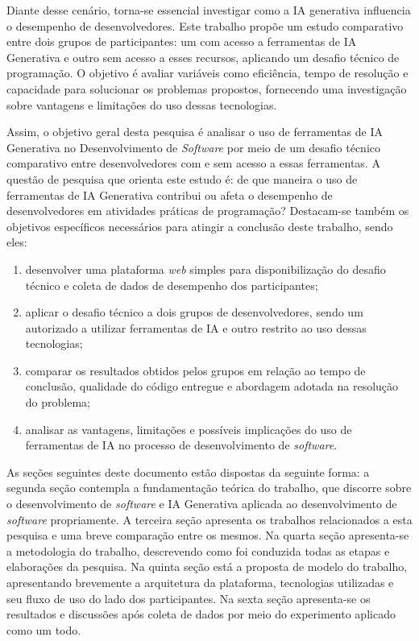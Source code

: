 \documentclass[english,brazilian]{UNISINOSartigo} %
\begin{document}
Diante desse cenário, torna-se essencial investigar como a IA generativa influencia o desempenho de desenvolvedores. Este trabalho propõe um estudo comparativo entre dois grupos de participantes: um com acesso a ferramentas de IA Generativa e outro sem acesso a esses recursos, aplicando um desafio técnico de programação. O objetivo é avaliar variáveis como eficiência, tempo de resolução e capacidade para solucionar os problemas propostos, fornecendo uma investigação sobre vantagens e limitações do uso dessas tecnologias.

Assim, o objetivo geral desta pesquisa é analisar o uso de ferramentas de IA Generativa no Desenvolvimento de \textit{Software} por meio de um desafio técnico comparativo entre desenvolvedores com e sem acesso a essas ferramentas. A questão de pesquisa que orienta este estudo é: de que maneira o uso de ferramentas de IA Generativa contribui ou afeta o desempenho de desenvolvedores em atividades práticas de programação? Destacam-se também os objetivos específicos necessários para atingir a conclusão deste trabalho, sendo eles:

\begin{enumerate}[label=\alph*), leftmargin=1.2cm, itemsep=0.1em, topsep=0.1em]
    \item desenvolver uma plataforma \textit{web} simples para disponibilização do desafio técnico e coleta de dados de desempenho dos participantes;
    \item aplicar o desafio técnico a dois grupos de desenvolvedores, sendo um autorizado a utilizar ferramentas de IA e outro restrito ao uso dessas tecnologias;
    \item comparar os resultados obtidos pelos grupos em relação ao tempo de conclusão, qualidade do código entregue e abordagem adotada na resolução do problema;
    \item analisar as vantagens, limitações e possíveis implicações do uso de ferramentas de IA no processo de desenvolvimento de \textit{software}.
\end{enumerate}

As seções seguintes deste documento estão dispostas da seguinte forma: a segunda seção contempla a fundamentação teórica do trabalho, que discorre sobre o desenvolvimento de \textit{software} e IA Generativa aplicada ao desenvolvimento de \textit{software} propriamente. A terceira seção apresenta os trabalhos relacionados a esta pesquisa e uma breve comparação entre os mesmos. Na quarta seção apresenta-se a metodologia do trabalho, descrevendo como foi conduzida todas as etapas e elaborações da pesquisa. Na quinta seção está a proposta de modelo do trabalho, apresentando brevemente a arquitetura da plataforma, tecnologias utilizadas e seu fluxo de uso do lado dos participantes. Na sexta seção apresenta-se os resultados e discussões após coleta de dados por meio do experimento aplicado como um todo.
\end{document}
